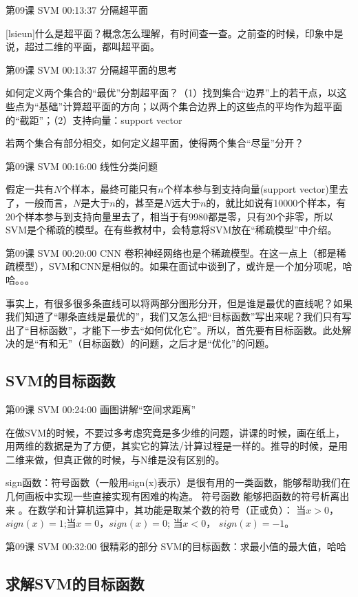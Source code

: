 \documentclass[UTF8]{ctexart}
\begin{document}
第09课 SVM 00:13:37 分隔超平面

[lsieun]什么是超平面？概念怎么理解，有时间查一查。之前查的时候，印象中是说，超过二维的平面，都叫超平面。

第09课 SVM 00:13:37 分隔超平面的思考

如何定义两个集合的“最优”分割超平面？（1）找到集合“边界”上的若干点，以这些点为“基础”计算超平面的方向；以两个集合边界上的这些点的平均作为超平面的“截距”；（2）支持向量：support vector

若两个集合有部分相交，如何定义超平面，使得两个集合“尽量”分开？

第09课 SVM 00:16:00 线性分类问题

假定一共有$N$个样本，最终可能只有$n$个样本参与到支持向量(support vector)里去了，一般而言，$N$是大于$n$的，甚至是$N$远大于$n$的，就比如说有10000个样本，有20个样本参与到支持向量里去了，相当于有9980都是零，只有20个非零，所以SVM是个稀疏的模型。在有些教材中，会特意将SVM放在“稀疏模型”中介绍。

第09课 SVM 00:20:00 CNN 卷积神经网络也是个稀疏模型。在这一点上（都是稀疏模型），SVM和CNN是相似的。如果在面试中谈到了，或许是一个加分项呢，哈哈。。。

事实上，有很多很多条直线可以将两部分图形分开，但是谁是最优的直线呢？如果我们知道了“哪条直线是最优的”，我们又怎么把“目标函数”写出来呢？我们只有写出了“目标函数”，才能下一步去“如何优化它”。所以，首先要有目标函数。此处解决的是“有和无”（目标函数）的问题，之后才是“优化”的问题。

\subsection{SVM的目标函数}

第09课 SVM 00:24:00 画图讲解“空间求距离”

在做SVM的时候，不要过多考虑究竟是多少维的问题，讲课的时候，画在纸上，用两维的数据是为了方便，其实它的算法/计算过程是一样的。推导的时候，是用二维来做，但真正做的时候，与N维是没有区别的。

sign函数：符号函数（一般用sign(x)表示）是很有用的一类函数，能够帮助我们在几何画板中实现一些直接实现有困难的构造。 符号函数 能够把函数的符号析离出来 。在数学和计算机运算中，其功能是取某个数的符号（正或负）： 当$x>0$，$sign(x)=1$;当$x=0$，$sign(x)=0$; 当$x<0$， $sign(x)=-1$。

第09课 SVM 00:32:00 很精彩的部分 SVM的目标函数：求最小值的最大值，哈哈

\subsection{求解SVM的目标函数}
\end{document}
